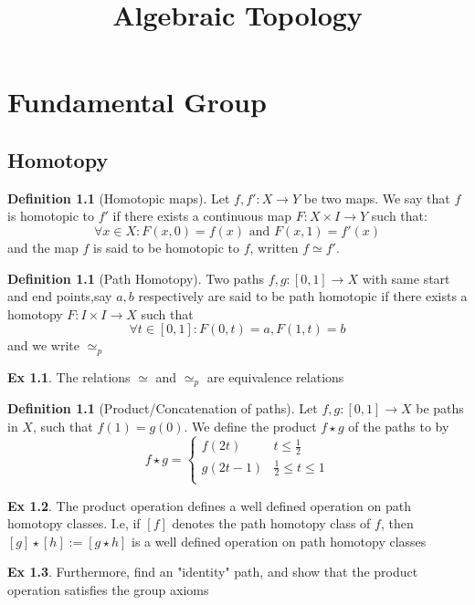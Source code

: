 \documentclass[10pt, openany]{book}
\title{Algebraic Topology}
\author{}
\date{}
\theoremstyle{plain}
\theoremstyle{definition}
\newtheorem{definition}[theorem]{Definition}
\newtheorem{exercise}{Ex}[section]
\theoremstyle{remark}
\begin{document}
\hypersetup{pageanchor=false}
\begin{titlepage}
\maketitle
\end{titlepage}
\hypersetup{pageanchor=true}
\tableofcontents
\chapter{Fundamental Group}
\section{Homotopy}
\begin{definition}[Homotopic maps]
  Let $f,f': X\rightarrow Y$ be two maps. We say that $f$ is homotopic to $f'$ if there exists a continuous map $F:X\times I\rightarrow Y$ such that:
  $$\forall x\in X: F(x,0) = f(x) \text{ and } F(x,1) = f'(x)$$ 
 and the map $f$ is said to be homotopic to $f$, written $f\simeq f'$.
\end{definition}
\begin{definition}[Path Homotopy]
  Two paths $f,g: [0,1]\rightarrow X$ with same start and end points,say $a,b$ respectively are said to be path homotopic if there exists a homotopy $F : I\times I\rightarrow X$ such that $$\forall t\in [0,1]: F(0,t) = a, F(1,t) = b$$ and we write $\simeq_p$ 
\end{definition}
\begin{exercise}
The relations $\simeq$ and $\simeq_p$ are equivalence relations
\end{exercise}
\begin{definition}[Product/Concatenation of paths]
  Let $f,g:[0,1]\rightarrow X$ be paths in $X$, such that $f(1) = g(0)$. We define the product $f\star g$ of the paths to by $$f\star g = \begin{cases}
    f(2t) & t\leq \frac{1}{2}\\
    g(2t -1) & \frac{1}{2} \leq t \leq 1\\
  \end{cases}$$
\end{definition}
\begin{exercise}
  The product operation defines a well defined operation on  path homotopy classes. I.e, if $[f]$ denotes the path homotopy class of $f$, then $[g]\star [h] := [g\star h]$ is a well defined operation on path homotopy classes
\end{exercise}
\begin{exercise}
  Furthermore, find an "identity" path, and show that the product operation satisfies the group axioms
\end{exercise}
\end{document}
